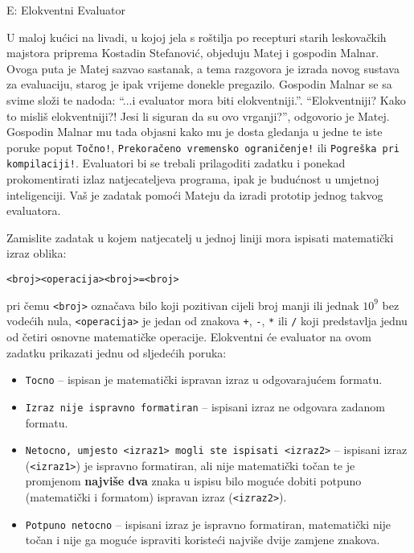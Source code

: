 \begin{statement}[
  timelimit=1 s,
  memorylimit=512 MiB,
]{E: Elokventni Evaluator}

U maloj kućici na livadi, u kojoj jela s roštilja po recepturi starih
leskovačkih majstora priprema Kostadin Stefanović, objeduju Matej i gospodin
Malnar. Ovoga puta je Matej sazvao sastanak, a tema razgovora je izrada novog
sustava za evaluaciju, starog je ipak vrijeme donekle pregazilo.
Gospodin Malnar se sa svime složi te nadoda: ``...i evaluator mora biti
elokventniji.''. ``Elokventniji? Kako to misliš elokventniji?! Jesi li siguran
da su ovo vrganji?'', odgovorio je Matej. Gospodin Malnar mu tada objasni kako mu je
dosta gledanja u jedne te iste poruke poput \texttt{Točno!},
\texttt{Prekoračeno vremensko ograničenje!} ili \texttt{Pogreška pri kompilaciji!}.
Evaluatori bi se trebali prilagoditi zadatku i ponekad prokomentirati izlaz
natjecateljeva programa, ipak je budućnost u umjetnoj inteligenciji. Vaš je
zadatak pomoći Mateju da izradi prototip jednog takvog evaluatora.

Zamislite zadatak u kojem natjecatelj u jednoj liniji mora ispisati matematički
izraz oblika:
\begin{center}
\texttt{<broj><operacija><broj>=<broj>}
\end{center}
pri čemu \texttt{<broj>}
označava bilo koji pozitivan cijeli broj manji ili jednak $10^9$ bez vodećih nula,
\texttt{<operacija>} je jedan od znakova \texttt{+}, \texttt{-}, \texttt{*} ili
\texttt{/} koji predstavlja jednu od četiri osnovne matematičke operacije.
Elokventni će evaluator na ovom zadatku prikazati jednu od sljedećih poruka:

\begin{itemize}
  \item \texttt{Tocno} -- ispisan je matematički ispravan izraz u odgovarajućem formatu.
  \item \texttt{Izraz nije ispravno formatiran} -- ispisani izraz ne odgovara zadanom formatu.
  \item \texttt{Netocno, umjesto <izraz1> mogli ste ispisati <izraz2>} --
    ispisani izraz (\texttt{<izraz1>}) je ispravno formatiran, ali nije
    matematički točan te je promjenom \textbf{najviše dva} znaka u ispisu bilo
    moguće dobiti potpuno (matematički i formatom) ispravan izraz (\texttt{<izraz2>}).
  \item \texttt{Potpuno netocno} -- ispisani izraz je ispravno formatiran,
    matematički nije točan i nije ga moguće ispraviti koristeći najviše dvije
    zamjene znakova.
\end{itemize}

\end{statement}
